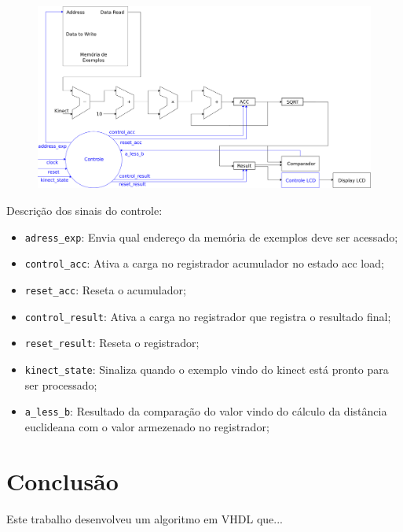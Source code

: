 \documentclass[12pt]{article}
\begin{document}
\begin{figure}[!ht]
\centering
\includegraphics[scale=0.36]{img/circuito_knn.png}
\end{figure}

Descrição dos sinais do controle:

\begin{itemize}

\item \verb|adress_exp|:  Envia qual endereço da memória de exemplos deve ser acessado;
\item \verb|control_acc|: Ativa a carga no registrador acumulador no estado acc load;
\item \verb|reset_acc|: Reseta o acumulador;
\item \verb|control_result|: Ativa a carga no registrador que registra o resultado final;
\item \verb|reset_result|: Reseta o registrador;
\item \verb|kinect_state|: Sinaliza quando o exemplo vindo do kinect está pronto para ser processado;
\item \verb|a_less_b|: Resultado da comparação do valor vindo do cálculo da distância euclideana com o valor armezenado no registrador;
\end{itemize} 


\section{Conclus\~ao}\label{sec:figs}

Este trabalho desenvolveu um algoritmo em VHDL que...


\end{document}
